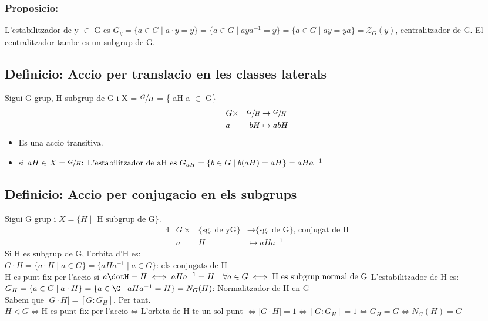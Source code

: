 \documentclass[11pt]{article}
\begin{document}
\subsubsection{Proposicio:}
\label{sec:orgbf426f0}
L'estabilitzador de y \(\in\) G es \(G_y = \{a \in G \mid a \cdot y = y \} = \{ a \in G \mid aya^{-1} = y \} = \{ a \in G \mid ay = ya \} = \mathcal{Z}_{G}(y)\),  centralitzador de G. El centralitzador tambe es un subgrup de G.

\subsection{Definicio: Accio per translacio en les classes laterals}
\label{sec:orgcebfe8d}
Sigui G grup, H subgrup de G i X = \(\sfrac{G}{H}\) = \{ aH \mid a \(\in\) G\}
\begin{alignat*}{4}
&G \times &\sfrac{G}{H} &\to \sfrac{G}{H} \\
&a &bH &\mapsto abH
\end{alignat*}

\begin{itemize}
\item Es una accio transitiva.
\item si \(aH \in X = \sfrac{G}{H} \text{: L'estabilitzador de aH es } G_{aH} = \{ b \in G \mid b(aH) = aH \} = aHa^{-1}\)
\end{itemize}


\subsection{Definicio: Accio per conjugacio en els subgrups}
\label{sec:org479222d}
Sigui G grup i \(X = \{ H \mid \text{ H subgrup de G} \}.\)
\begin{alignat*}{4}
&G \times &\text{\{sg. de yG\}} &\to \text{\{sg. de G\}, conjugat de H} \\
&a &H &\mapsto aHa^{-1}
\end{alignat*}
Si H es subgrup de G, l'orbita d'H es: \\
\(G\cdot H =\{a \cdot H\mid a\in G \} = \{aHa^{-1} \mid a \in G \} \text{: els conjugats de H}\) \\
H es punt fix per l'accio si \(a\dotH = H \iff aHa^{-1} = H \quad \forall a \in G \iff \text{H es subgrup normal de G}\) 
L'estabilitzador de H es: \(G_H = \{a \in G \mid a \cdot H\} = \{ a \in \G \mid aHa^{-1} = H \} = N_{G}(H)\): Normalitzador de H en G\\
Sabem que \(\vert G \cdot H\vert = [G : G_H ].\) Per tant. \\
\(H \vartriangleleft G \iff \text{H es punt fix per l'accio} \iff \text{L'orbita de H te un sol punt } \iff \vert G \cdot H \vert = 1 \iff [ G : G_H] = 1 \iff G_H = G \iff N_{G}(H) = G\) 
\end{document}

